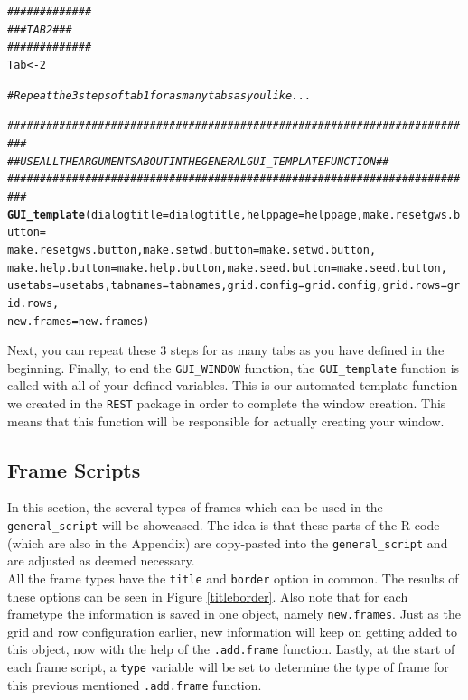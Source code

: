 \documentclass[a4paper]{article}\usepackage[]{graphicx}\usepackage[]{color}
\makeatletter
\newcommand{\hlnum}[1]{\textcolor[rgb]{0.686,0.059,0.569}{#1}}%
\newcommand{\hlcom}[1]{\textcolor[rgb]{0.678,0.584,0.686}{\textit{#1}}}%
\newcommand{\hlstd}[1]{\textcolor[rgb]{0.345,0.345,0.345}{#1}}%
\newcommand{\hlkwb}[1]{\textcolor[rgb]{0.69,0.353,0.396}{#1}}%
\newcommand{\hlkwc}[1]{\textcolor[rgb]{0.333,0.667,0.333}{#1}}%
\newcommand{\hlkwd}[1]{\textcolor[rgb]{0.737,0.353,0.396}{\textbf{#1}}}%
\newenvironment{kframe}{%
 \def\at@end@of@kframe{}%
 \ifinner\ifhmode%
  \def\at@end@of@kframe{\end{minipage}}%
  \begin{minipage}{\columnwidth}%
 \fi\fi%
 \def\FrameCommand##1{\hskip\@totalleftmargin \hskip-\fboxsep
 \colorbox{shadecolor}{##1}\hskip-\fboxsep
     \hskip-\linewidth \hskip-\@totalleftmargin \hskip\columnwidth}%
 \MakeFramed {\advance\hsize-\width
   \@totalleftmargin\z@ \linewidth\hsize
   \@setminipage}}%
 {\par\unskip\endMakeFramed%
 \at@end@of@kframe}
\newenvironment{knitrout}{}{} %
\makeatother
\begin{document}
\begin{knitrout}
\color{fgcolor}\begin{kframe}
\begin{alltt}
\hlcom{#############}
\hlcom{### TAB 2 ###}
\hlcom{#############}
\hlstd{Tab} \hlkwb{<-} \hlnum{2}

\hlcom{# Repeat the 3 steps of tab 1 for as many tabs as you like...}


\hlcom{#########################################################################}
\hlcom{## USE ALL THE ARGUMENTS ABOUT IN THE GENERAL GUI_TEMPLATE FUNCTION    ##}
\hlcom{#########################################################################}
\hlkwd{GUI_template}\hlstd{(}\hlkwc{dialogtitle}\hlstd{=dialogtitle,}\hlkwc{helppage}\hlstd{=helppage,}\hlkwc{make.resetgws.button}\hlstd{=}
                \hlstd{make.resetgws.button,}\hlkwc{make.setwd.button}\hlstd{=make.setwd.button,}
                \hlkwc{make.help.button}\hlstd{=make.help.button,}\hlkwc{make.seed.button}\hlstd{=make.seed.button,}
                \hlkwc{usetabs}\hlstd{=usetabs,}\hlkwc{tabnames}\hlstd{=tabnames,}\hlkwc{grid.config}\hlstd{=grid.config,}\hlkwc{grid.rows}\hlstd{=grid.rows,}
                \hlkwc{new.frames}\hlstd{=new.frames)}
\end{alltt}
\end{kframe}
\end{knitrout}
\noindent Next, you can repeat these 3 steps for as many tabs as you have
defined in the beginning. Finally, to end the \verb|GUI_WINDOW| function, the
\verb|GUI_template| function is called with all of your defined variables. 
This is our automated template function we created in the \verb|REST| package in
order to complete the window creation. This means that this function will be responsible
for actually creating your window.

\subsection{Frame Scripts}
In this section, the several types of frames which can be used in the
\verb|general_script| will be showcased. The idea is that these parts of the
R-code (which are also in the Appendix) are copy-pasted into the
\verb|general_script| and are adjusted as deemed necessary. \\
All the frame types have the \verb|title| and
\verb|border| option in common. The results of these options can be seen in
Figure \ref{titleborder}. Also note that for each frametype the information is
saved in one object, namely \verb|new.frames|. Just as the grid and row configuration
earlier, new information will keep on getting added to this object, now with
the help of the \verb|.add.frame| function. Lastly, at the start of each frame
script, a \verb|type| variable will be set to determine the type of frame for
this previous mentioned \verb|.add.frame| function.
\end{document}

